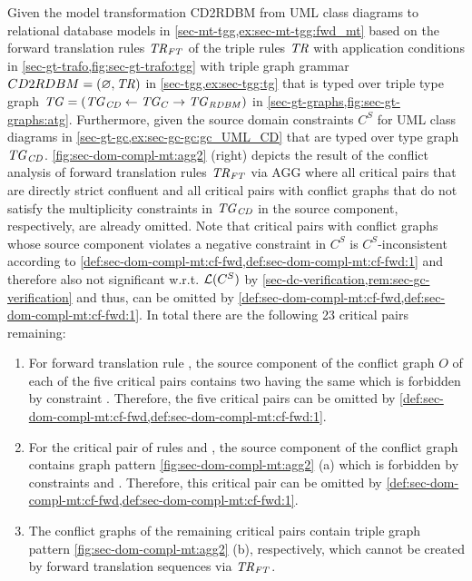 \begin{example}
\label{ex:sec-dom-compl-mt:domcp}
Given the model transformation CD2RDBM from UML class diagrams to relational database models in \cref{sec-mt-tgg,ex:sec-mt-tgg:fwd_mt} based on the forward translation rules $\mathit{TR}_\mathit{FT}$ of the triple rules $\mathit{TR}$ with application conditions in \cref{sec-gt-trafo,fig:sec-gt-trafo:tgg} with triple graph grammar $CD2RDBM=(\varnothing,\mathit{TR})$ in \cref{sec-tgg,ex:sec-tgg:tg} that is typed over triple type graph $\mathit{TG}=(\mathit{TG}_\mathit{CD} \gets \mathit{TG}_C \to \mathit{TG}_\mathit{RDBM})$ in \cref{sec-gt-graphs,fig:sec-gt-graphs:atg}.
Furthermore, given the source domain constraints $C^S$ for UML class diagrams in \cref{sec-gt-gc,ex:sec-gc-gc:gc_UML_CD} that are typed over type graph $\mathit{TG}_\mathit{CD}$.
\cref{fig:sec-dom-compl-mt:agg2} (right) depicts the result of the conflict analysis of forward translation rules $\mathit{TR}_\mathit{FT}$ via AGG \cite{AGG} where all critical pairs that are directly strict confluent and all critical pairs with conflict graphs that do not satisfy the multiplicity constraints in $\mathit{TG}_\mathit{CD}$ in the source component, respectively, are already omitted.
Note that critical pairs with conflict graphs whose source component violates a negative constraint in $C^S$ is $C^S$-inconsistent according to \cref{def:sec-dom-compl-mt:cf-fwd,def:sec-dom-compl-mt:cf-fwd:1} and therefore also not significant w.r.t. $\mathcal{L}(C^S)$ by \cref{sec-dc-verification,rem:sec-gc-verification} and thus, can be omitted by \cref{def:sec-dom-compl-mt:cf-fwd,def:sec-dom-compl-mt:cf-fwd:1}.
In total there are the following 23 critical pairs remaining:
\begin{enumerate}
  \item For forward translation rule , the source component of the conflict graph $O$ of each of the five critical pairs contains two  having the same  which is forbidden by constraint .
  Therefore, the five critical pairs can be omitted by \cref{def:sec-dom-compl-mt:cf-fwd,def:sec-dom-compl-mt:cf-fwd:1}.
  \item For the critical pair of rules  and , the source component of the conflict graph contains graph pattern \cref{fig:sec-dom-compl-mt:agg2} (a) which is forbidden by constraints  and .
  Therefore, this critical pair can be omitted by \cref{def:sec-dom-compl-mt:cf-fwd,def:sec-dom-compl-mt:cf-fwd:1}.
  \item The conflict graphs of the remaining critical pairs contain triple graph pattern \cref{fig:sec-dom-compl-mt:agg2} (b), respectively, which cannot be created by forward translation sequences via $\mathit{TR}_\mathit{FT}$.

\end{enumerate}
\end{example}
